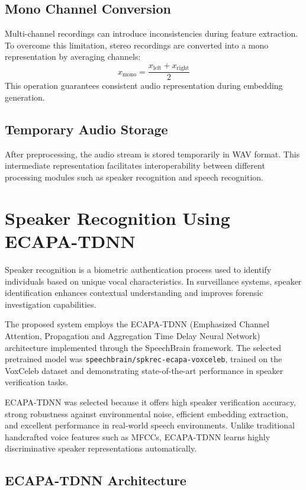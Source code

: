 \documentclass[12pt]{report}
\begin{document}
\subsection{Mono Channel Conversion}

Multi-channel recordings can introduce inconsistencies during feature extraction. To overcome this limitation, stereo recordings are converted into a mono representation by averaging channels:
\[
x_{\text{mono}} = \frac{x_{\text{left}} + x_{\text{right}}}{2}
\]
This operation guarantees consistent audio representation during embedding generation.

\subsection{Temporary Audio Storage}

After preprocessing, the audio stream is stored temporarily in WAV format. This intermediate representation facilitates interoperability between different processing modules such as speaker recognition and speech recognition.

\section{Speaker Recognition Using ECAPA-TDNN}

Speaker recognition is a biometric authentication process used to identify individuals based on unique vocal characteristics. In surveillance systems, speaker identification enhances contextual understanding and improves forensic investigation capabilities.

The proposed system employs the ECAPA-TDNN (Emphasized Channel Attention, Propagation and Aggregation Time Delay Neural Network) architecture implemented through the SpeechBrain framework. The selected pretrained model was \texttt{speechbrain/spkrec-ecapa-voxceleb}, trained on the VoxCeleb dataset and demonstrating state-of-the-art performance in speaker verification tasks.

ECAPA-TDNN was selected because it offers high speaker verification accuracy, strong robustness against environmental noise, efficient embedding extraction, and excellent performance in real-world speech environments. Unlike traditional handcrafted voice features such as MFCCs, ECAPA-TDNN learns highly discriminative speaker representations automatically.

\subsection{ECAPA-TDNN Architecture}
\end{document}
